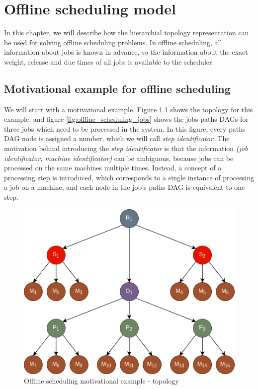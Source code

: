 \chapter{Offline scheduling model}
\label{sec:offline_scheduling_model}

In this chapter, we will describe how the hierarchial topology representation can be used for solving offline scheduling problems. In offline scheduling, all information about jobs is known in advance, so the information about the exact weight, release and due times of all jobs is available to the scheduler.

\section{Motivational example for offline scheduling}
\label{sec:offline_scheduling_motivational_example}

We will start with a motivational example. Figure \ref{fig:offline_scheduling_topology} shows the topology for this example, and figure \ref{fig:offline_scheduling_jobs} shows the jobs paths DAGs for three jobs which need to be processed in the system. In this figure, every paths DAG node is assigned a number, which we will call \textit{step identificator}. The motivation behind introducing the \textit{step identificator} is that the information \textit{(job identificator, machine identificator)} can be ambiguous, because jobs can be processed on the same machines multiple times. Instead, a concept of a processing step is introduced, which corresponds to a single instance of processing a job on a machine, and each node in the job's paths DAG is equivalent to one step.

\begin{figure}[!htbp]
	\centering
	\includegraphics[scale=0.6]{../images/offline_scheduling_topology.png}
	\caption{Offline scheduling motivational example - topology}
    \label{fig:offline_scheduling_topology}
\end{figure}

